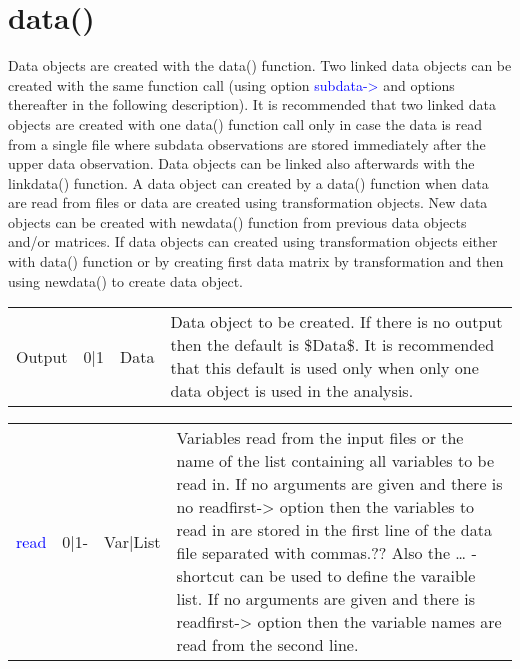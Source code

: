\section{data()}
\label{data}
 Data objects are created with the \textcolor{VioletRed}{data}() function. Two linked data objects can be created with the
 same function call (using option \textcolor{blue}{subdata->} and options thereafter in the following
 description). It is recommended that two linked data objects are created with one \textcolor{VioletRed}{data}()
 function call only in case the data is read from a single file where subdata observations are
 stored immediately after the upper data observation.  Data objects can be linked also afterwards with the \textcolor{VioletRed}{linkdata}() function.
 A data object can created by a \textcolor{VioletRed}{data}() function when data are read from files
 or data are created using transformation objects. New data objects can
be created with \textcolor{VioletRed}{newdata}() function from previous data objects and/or matrices.
If data objects can created using transformation objects either with \textcolor{VioletRed}{data}() function
or by creating first data matrix by transformation and then using \textcolor{VioletRed}{newdata}() to
 create data object.
\begin{table}[H]
\begin{tabular}{ m{}  m{}m{}p{}}
 Output &0|1&Data&
 Data object to be created. If there is no output then the default is \$Data\$.
 It is recommended that this default is used only when only one data object
 is used in the analysis.

\\ \cline{1-4}
\end{tabular}
\end{table}
\vspace{-1.51em}
\begin{table}[H]
\begin{tabular}{ m{}  m{}m{}p{}}
 \textcolor{blue}{read} &0|1-&Var|List& Variables read from the input files or the name of the list containing all variables
 to be read in. If no arguments are given and there is no readfirst-> option
 then the variables to read in are stored in the first line of the data file separated
 with commas.?? Also the … -shortcut can be used to define the varaible list. If no arguments are given and
 there is readfirst-> option then the variable names are read from the second
 line.
\\ \cline{1-4}
\end{tabular}
\end{table}
